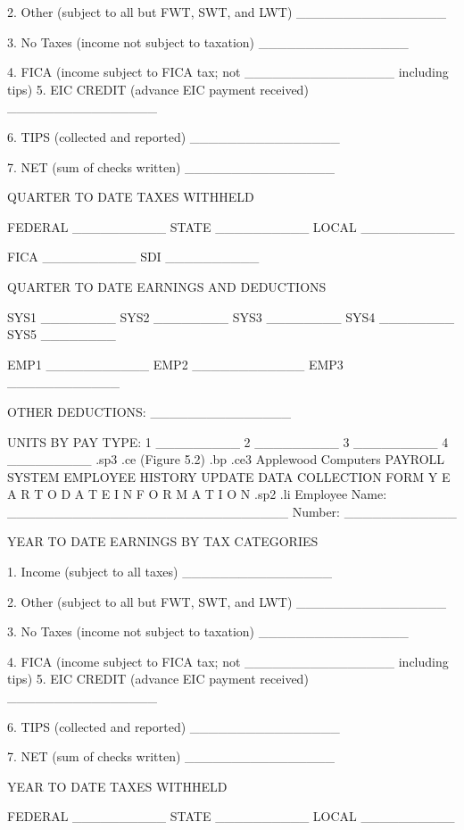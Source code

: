 2. Other (subject to all but FWT, SWT, and LWT)    ________________

3. No Taxes (income not subject to taxation)	   ________________

4. FICA (income subject to FICA tax; not	   ________________
   including tips)
5. EIC CREDIT (advance EIC payment received)	   ________________

6. TIPS (collected and reported)		   ________________

7. NET (sum of checks written)			   ________________



		QUARTER TO DATE TAXES WITHHELD

       FEDERAL __________   STATE __________  LOCAL __________

		 FICA __________  SDI __________



	     QUARTER TO DATE EARNINGS AND DEDUCTIONS

SYS1 ________ SYS2 ________ SYS3 ________ SYS4 ________ SYS5 ________

	  EMP1 ___________  EMP2 ____________  EMP3 ____________

OTHER DEDUCTIONS: _______________

UNITS BY PAY TYPE: 1 _________	2 _________  3 _________  4 _________
.sp3
.ce
(Figure 5.2)
.bp
.ce3
Applewood Computers PAYROLL SYSTEM
EMPLOYEE HISTORY UPDATE DATA COLLECTION FORM
Y E A R    T O	  D A T E    I N F O R M A T I O N
.sp2
.li
Employee Name: ______________________________  Number: ____________



	    YEAR TO DATE EARNINGS BY TAX CATEGORIES

1. Income (subject to all taxes)		   ________________

2. Other (subject to all but FWT, SWT, and LWT)    ________________

3. No Taxes (income not subject to taxation)	   ________________

4. FICA (income subject to FICA tax; not	   ________________
   including tips)
5. EIC CREDIT (advance EIC payment received)	   ________________

6. TIPS (collected and reported)		   ________________

7. NET (sum of checks written)			   ________________



		  YEAR TO DATE TAXES WITHHELD

       FEDERAL __________   STATE __________  LOCAL __________

